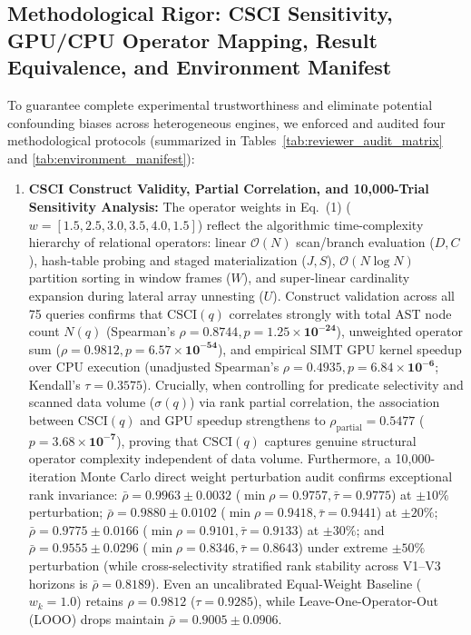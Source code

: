 \documentclass[10pt,a4paper]{article}
\begin{document}
\subsection{Methodological Rigor: CSCI Sensitivity, GPU/CPU Operator Mapping, Result Equivalence, and Environment Manifest}
To guarantee complete experimental trustworthiness and eliminate potential confounding biases across heterogeneous engines, we enforced and audited four methodological protocols (summarized in Tables~\ref{tab:reviewer_audit_matrix} and \ref{tab:environment_manifest}):
\begin{enumerate}[leftmargin=1.5em,itemsep=2pt]
    \item \textbf{CSCI Construct Validity, Partial Correlation, and 10,000-Trial Sensitivity Analysis:} The operator weights in Eq.~(1) ($w = [1.5, 2.5, 3.0, 3.5, 4.0, 1.5]$) reflect the algorithmic time-complexity hierarchy of relational operators: linear $\mathcal{O}(N)$ scan/branch evaluation ($D, C$), hash-table probing and staged materialization ($J, S$), $\mathcal{O}(N \log N)$ partition sorting in window frames ($W$), and super-linear cardinality expansion during lateral array unnesting ($U$). Construct validation across all 75 queries confirms that $\text{CSCI}(q)$ correlates strongly with total AST node count $N(q)$ (Spearman's $\rho = \mathbf{0.8744}, p = \mathbf{1.25 \times 10^{-24}}$), unweighted operator sum ($\rho = \mathbf{0.9812}, p = \mathbf{6.57 \times 10^{-54}}$), and empirical SIMT GPU kernel speedup over CPU execution (unadjusted Spearman's $\rho = \mathbf{0.4935}, p = \mathbf{6.84 \times 10^{-6}}$; Kendall's $\tau = \mathbf{0.3575}$). Crucially, when controlling for predicate selectivity and scanned data volume ($\sigma(q)$) via rank partial correlation, the association between $\text{CSCI}(q)$ and GPU speedup strengthens to $\rho_{\text{partial}} = \mathbf{0.5477}$ ($p = \mathbf{3.68 \times 10^{-7}}$), proving that $\text{CSCI}(q)$ captures genuine structural operator complexity independent of data volume. Furthermore, a 10,000-iteration Monte Carlo direct weight perturbation audit confirms exceptional rank invariance: $\bar{\rho} = \mathbf{0.9963} \pm 0.0032$ ($\min \rho = 0.9757, \bar{\tau}=0.9775$) at $\pm 10\%$ perturbation; $\bar{\rho} = \mathbf{0.9880} \pm 0.0102$ ($\min \rho = 0.9418, \bar{\tau}=0.9441$) at $\pm 20\%$; $\bar{\rho} = \mathbf{0.9775} \pm 0.0166$ ($\min \rho = 0.9101, \bar{\tau}=0.9133$) at $\pm 30\%$; and $\bar{\rho} = \mathbf{0.9555} \pm 0.0296$ ($\min \rho = 0.8346, \bar{\tau}=0.8643$) under extreme $\pm 50\%$ perturbation (while cross-selectivity stratified rank stability across V1--V3 horizons is $\bar{\rho}=0.8189$). Even an uncalibrated Equal-Weight Baseline ($w_k = 1.0$) retains $\rho = \mathbf{0.9812}$ ($\tau = 0.9285$), while Leave-One-Operator-Out (LOOO) drops maintain $\bar{\rho} = \mathbf{0.9005} \pm 0.0906$.

\end{enumerate}
\end{document}
